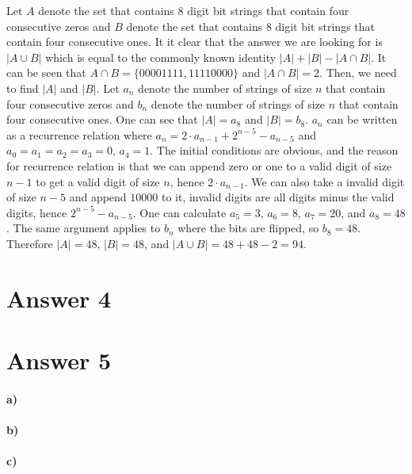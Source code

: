 \documentclass[12pt]{article}
\newcommand{\+}{\mkern2mu}
\begin{document}
Let $A$ denote the set that contains 8 digit bit strings that contain four consecutive zeros and $B$ denote the set that contains 8 digit bit strings that contain four consecutive ones. It it clear that the answer we are looking for is $|A \cup B|$ which is equal to the commonly known identity $|A| + |B| - |A \cap B|$. It can be seen that $A \cap B = \{00001111, 11110000\}$ and $|A \cap B| = 2$. Then, we need to find $|A|$ and $|B|$.
\newline
Let $a_n$ denote the number of strings of size $n$ that contain four consecutive zeros and $b_n$ denote the number of strings of size $n$ that contain four consecutive ones. One can see that $|A| = a_8$ and $|B| = b_8$.
\newline
$a_n$ can be written as a recurrence relation where $a_n = 2 \cdot a_{n-1} + 2^{n-5} - a_{n-5}$ and $a_0 = a_1 = a_2 = a_3 = 0$, $a_4 = 1$. The initial conditions are obvious, and the reason for recurrence relation is that we can append zero or one to a valid digit of size $n - 1$ to get a valid digit of size $n$, hence $2 \cdot a_{n-1}$. We can also take a invalid digit of size $n - 5$ and append $10000$ to it, invalid digits are all digits minus the valid digits, hence $2^{n-5} - a_{n-5}$. One can calculate $a_5 = 3$, $a_6 = 8$, $a_7 = 20$, and $a_8 = 48$.
\newline
The same argument applies to $b_n$ where the bits are flipped, so $b_8 = 48$. Therefore $|A| = 48$, $|B| = 48$, and $|A \cup B| = 48 + 48 - 2 = 94$.

\section*{Answer 4}

\section*{Answer 5}
\paragraph{a)}
\paragraph{b)}
\paragraph{c)}
\end{document}
